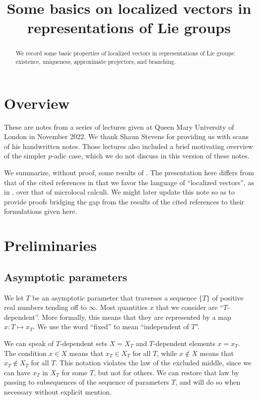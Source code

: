 \documentclass[reqno]{amsart} 
\title{Some basics on localized vectors in representations of Lie groups}
\numberwithin{equation}{section}
\numberwithin{theorem}{section}
\begin{document}
\maketitle
\tableofcontents

\begin{abstract}
We record some basic properties of localized vectors in representations of Lie groups: existence, uniqueness, approximate projectors, and branching.
\end{abstract}

\section{Overview}\label{sec:d1a8de613824}
These are notes from a series of lectures given at Queen Mary University of London in November 2022.  We thank Shaun Stevens for providing us with scans of his handwritten notes.  Those lectures also included a brief motivating overview of the simpler $p$-adic case, which we do not discuss in this version of these notes.

We summarize, without proof, some results of \cite{nelson-venkatesh-1, 2020arXiv201202187N, 2021arXiv210915230N}.  The presentation here differs from that of the cited references in that we favor the language of ``localized vectors'', as in \cite[\S1.7]{nelson-venkatesh-1}, over that of microlocal calculi.  We might later update this note so as to provide proofs bridging the gap from the results of the cited references to their formulations given here.

\section{Preliminaries}\label{sec:d1a8de613e9a}
\subsection{Asymptotic parameters}\label{sec:d1a8dda545b5}
We let $T$ be an asymptotic parameter that traverses a sequence $\{T\}$ of positive real numbers tending off to $\infty$.  Most quantities $x$ that we consider are ``$T$-dependent''.  More formally, this means that they are represented by a map $x: T \mapsto x_T$.  We use the word ``fixed'' to mean ``independent of $T$''.

We can speak of $T$-dependent sets $X = X_T$ and $T$-dependent elements $x = x_T$.  The condition $x \in X$ means that $x_T \in X_T$ for all $T$, while $x \notin X$ means that $x_T \notin X_T$ for all $T$.  This notation violates the law of the excluded middle, since we can have $x_T$ in $X_T$ for some $T$, but not for others.  We can restore that law by passing to subsequences of the sequence of parameters $T$, and will do so when necessary without explicit mention.
\end{document}
